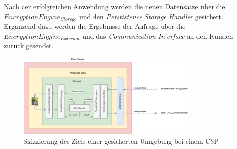 
 Nach der erfolgreichen Anwendung werden die neuen Datensätze über die $EncryptionEngine_{Storage}$ und den \emph{Perstistence Storage Handler} gesichert. Ergänzend dazu werden die Ergebnisse der Anfrage über die $EncryptionEngine_{External}$ und das \emph{Communication Interface} an den Kunden zurück gesendet.
 
 
 \begin{figure}[h!]
 	\centering
 	\includegraphics[width=0.8\textwidth]{img/enclave_details/enclave_details.pdf}
 	\caption{Skizzierung des Ziels einer gesicherten Umgebung bei einem \ac{CSP}}
 	\label{img:sgx-idea}
 \end{figure}